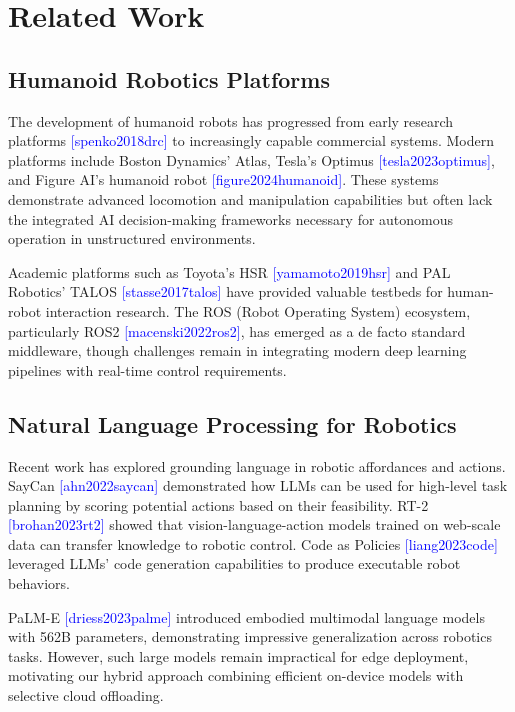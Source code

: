 \documentclass[conference]{IEEEtran}
\newcommand{\cite}[1]{\textcolor{blue}{[#1]}}
\begin{document}
\section{Related Work}
\label{sec:related}

\subsection{Humanoid Robotics Platforms}

The development of humanoid robots has progressed from early research platforms \cite{spenko2018drc} to increasingly capable commercial systems. Modern platforms include Boston Dynamics' Atlas, Tesla's Optimus \cite{tesla2023optimus}, and Figure AI's humanoid robot \cite{figure2024humanoid}. These systems demonstrate advanced locomotion and manipulation capabilities but often lack the integrated AI decision-making frameworks necessary for autonomous operation in unstructured environments.

Academic platforms such as Toyota's HSR \cite{yamamoto2019hsr} and PAL Robotics' TALOS \cite{stasse2017talos} have provided valuable testbeds for human-robot interaction research. The ROS (Robot Operating System) ecosystem, particularly ROS2 \cite{macenski2022ros2}, has emerged as a de facto standard middleware, though challenges remain in integrating modern deep learning pipelines with real-time control requirements.

\subsection{Natural Language Processing for Robotics}

Recent work has explored grounding language in robotic affordances and actions. SayCan \cite{ahn2022saycan} demonstrated how LLMs can be used for high-level task planning by scoring potential actions based on their feasibility. RT-2 \cite{brohan2023rt2} showed that vision-language-action models trained on web-scale data can transfer knowledge to robotic control. Code as Policies \cite{liang2023code} leveraged LLMs' code generation capabilities to produce executable robot behaviors.

PaLM-E \cite{driess2023palme} introduced embodied multimodal language models with 562B parameters, demonstrating impressive generalization across robotics tasks. However, such large models remain impractical for edge deployment, motivating our hybrid approach combining efficient on-device models with selective cloud offloading.
\end{document}
